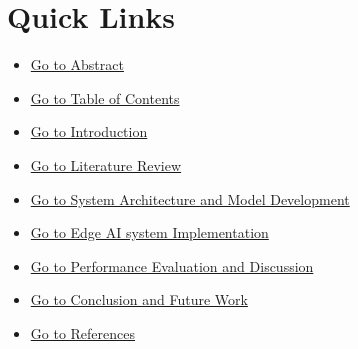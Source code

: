 \documentclass[12pt]{report} \usepackage[T1]{fontenc}
\newcommand{\customlink}[2]{\hyperlink{#1}{#2}}
\begin{document}

\appendix
\newpage

% 

% 

% 

% 


\newpage
\section*{Quick Links}
\begin{itemize}
    \item \customlink{Abstract}{Go to Abstract}
    \item \customlink{tableofcontents}{Go to Table of Contents}
    \item \customlink{Chapter_1}{Go to Introduction}
    \item \customlink{Chapter_2}{Go to Literature Review}
    \item \customlink{Chapter_3}{Go to System Architecture and Model Development}
    \item \customlink{Chapter_4}{Go to Edge AI system Implementation}
    \item \customlink{Chapter_5}{Go to Performance Evaluation and Discussion}
    \item \customlink{Chapter_6}{Go to Conclusion and Future Work}
    \item \customlink{Bibliography}{Go to References}
\end{itemize}
\end{document}
